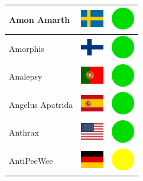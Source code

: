 \documentclass[12pt, a4paper, twoside]{report}
\begin{document}
\begin{center}
\begin{longtable}{|p{5cm}|p{2cm}|p{2cm}|}
Amon Amarth & \includegraphics[width=1cm]{4x3/se} & \includegraphics[width=1cm]{likes/y} \\ \hline
Amorphis & \includegraphics[width=1cm]{4x3/fi} & \includegraphics[width=1cm]{likes/y} \\ \hline
Analepsy & \includegraphics[width=1cm]{4x3/pt} & \includegraphics[width=1cm]{likes/y} \\ \hline
Angelus Apatrida & \includegraphics[width=1cm]{4x3/es} & \includegraphics[width=1cm]{likes/y} \\ \hline
Anthrax & \includegraphics[width=1cm]{4x3/us} & \includegraphics[width=1cm]{likes/y} \\ \hline
AntiPeeWee & \includegraphics[width=1cm]{4x3/de} & \includegraphics[width=1cm]{likes/m} \\ \hline

\end{longtable}
\end{center}
\end{document}
